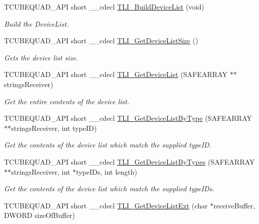 \begin{DoxyCompactItemize}
\item 
T\+C\+U\+B\+E\+Q\+U\+A\+D\+\_\+\+A\+PI short \+\_\+\+\_\+cdecl \hyperlink{group___t_cube_quad_ga9ca8fa5a7cdb1ddb3299a0d866fc4b8b}{T\+L\+I\+\_\+\+Build\+Device\+List} (void)
\begin{DoxyCompactList}\small\item\em Build the Device\+List. \end{DoxyCompactList}\item 
T\+C\+U\+B\+E\+Q\+U\+A\+D\+\_\+\+A\+PI short \+\_\+\+\_\+cdecl \hyperlink{group___t_cube_quad_ga2afece9535c5351276c468ff6e2e3af7}{T\+L\+I\+\_\+\+Get\+Device\+List\+Size} ()
\begin{DoxyCompactList}\small\item\em Gets the device list size. \end{DoxyCompactList}\item 
T\+C\+U\+B\+E\+Q\+U\+A\+D\+\_\+\+A\+PI short \+\_\+\+\_\+cdecl \hyperlink{group___t_cube_quad_gaab70fcc5ef3277cb714a0c16ee2867d1}{T\+L\+I\+\_\+\+Get\+Device\+List} (S\+A\+F\+E\+A\+R\+R\+AY $\ast$$\ast$strings\+Receiver)
\begin{DoxyCompactList}\small\item\em Get the entire contents of the device list. \end{DoxyCompactList}\item 
T\+C\+U\+B\+E\+Q\+U\+A\+D\+\_\+\+A\+PI short \+\_\+\+\_\+cdecl \hyperlink{group___t_cube_quad_gaeddc9697622c2c1f46ff51585770f99f}{T\+L\+I\+\_\+\+Get\+Device\+List\+By\+Type} (S\+A\+F\+E\+A\+R\+R\+AY $\ast$$\ast$strings\+Receiver, int type\+ID)
\begin{DoxyCompactList}\small\item\em Get the contents of the device list which match the supplied type\+ID. \end{DoxyCompactList}\item 
T\+C\+U\+B\+E\+Q\+U\+A\+D\+\_\+\+A\+PI short \+\_\+\+\_\+cdecl \hyperlink{group___t_cube_quad_gab873629414dcb54541faf0ece81d8d3b}{T\+L\+I\+\_\+\+Get\+Device\+List\+By\+Types} (S\+A\+F\+E\+A\+R\+R\+AY $\ast$$\ast$strings\+Receiver, int $\ast$type\+I\+Ds, int length)
\begin{DoxyCompactList}\small\item\em Get the contents of the device list which match the supplied type\+I\+Ds. \end{DoxyCompactList}\item 
T\+C\+U\+B\+E\+Q\+U\+A\+D\+\_\+\+A\+PI short \+\_\+\+\_\+cdecl \hyperlink{group___t_cube_quad_ga0006a1b1d106c95c0537659b0e32cbf0}{T\+L\+I\+\_\+\+Get\+Device\+List\+Ext} (char $\ast$receive\+Buffer, D\+W\+O\+RD size\+Of\+Buffer)
$$
\end{DoxyCompactItemize}
